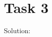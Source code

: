 \chapter{Task 3}
\begin{parlist}
	\item 
	\item Solution:
	\begin{figure}[hbt]
  \caption{}
\end{figure}

\end{parlist}
